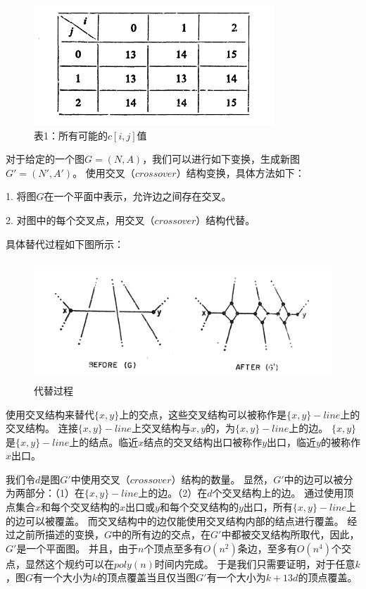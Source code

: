 \documentclass[UTF8]{ctexart}
\begin{document}
\begin{figure}[htbp]
    \centering %
    \includegraphics[height=4.5cm]{table1.png}
    \caption*{表1：所有可能的$c[i,j]$值}
\end{figure}
\par
对于给定的一个图$G=(N,A)$，我们可以进行如下变换，生成新图$G'=(N',A')$。
使用交叉（$crossover$）结构变换，具体方法如下：\par
1. 将图$G$在一个平面中表示，允许边之间存在交叉。 \par
2. 对图中的每个交叉点，用交叉（$crossover$）结构代替。\par
\noindent 具体替代过程如下图所示：
\begin{figure}[htbp]
    \centering %
    \includegraphics[height=4.5cm]{graph2.png}
    \caption{代替过程}
\end{figure}

使用交叉结构来替代$\{x,y\}$上的交点，这些交叉结构可以被称作是$\{x,y\}-line$上的交叉结构。
连接$\{x,y\}-line$上交叉结构与$x,y$的，为$\{x,y\}-line$上的边。
$\{x,y\}$是$\{x,y\}-line$上的结点。临近$x$结点的交叉结构出口被称作$y$出口，临近$y$的被称作$x$出口。 \par

我们令$d$是图$G'$中使用交叉（$crossover$）结构的数量。
显然，$G'$中的边可以被分为两部分：（1）在$\{x,y\}-line$上的边。（2）在$d$个交叉结构上的边。
通过使用顶点集合$x$和每个交叉结构的$x$出口或$y$和每个交叉结构的$y$出口，所有$\{x,y\}-line$上的边可以被覆盖。
而交叉结构中的边仅能使用交叉结构内部的结点进行覆盖。
经过之前所描述的变换，$G$中的所有边的交点，在$G'$中都被交叉结构所取代，因此，$G'$是一个平面图。
并且，由于$n$个顶点至多有$O(n^2)$条边，至多有$O(n^4)$个交点，显然这个规约可以在$poly(n)$时间内完成。
于是我们只需要证明，对于任意$k$，图$G$有一个大小为$k$的顶点覆盖当且仅当图$G'$有一个大小为$k+13d$的顶点覆盖。 \par
\end{document}
